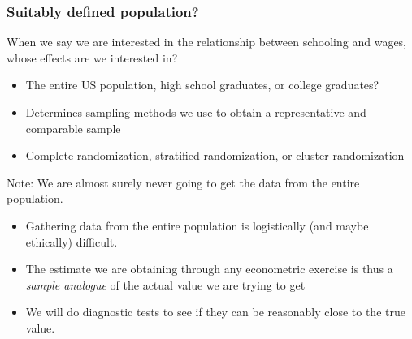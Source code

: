 \documentclass[aspectratio=169]{beamer}
\newenvironment{wideitemize}{\itemize\addtolength{\itemsep}{10pt}}{\enditemize}
\begin{document}
\begin{frame}
\frametitle{Suitably defined population?}
\begin{wideitemize}
\item When we say we are interested in the relationship between schooling and wages, whose effects are we interested in? 
\begin{itemize}
\item The entire US population, high school graduates, or college graduates?  
\item Determines sampling methods we use to obtain a representative and comparable sample
\item Complete randomization, stratified randomization, or cluster randomization
\end{itemize}
\item  Note: We are almost surely never going to get the data from the entire population. 
\begin{itemize}
\item Gathering data from the entire population is logistically (and maybe ethically) difficult. 
\item The estimate we are obtaining through any econometric exercise is thus a \textit{sample analogue} of the actual value we are trying to get
\item We will do diagnostic tests to see if they can be reasonably close to the true value. 
\end{itemize}
 \end{wideitemize}
\end{frame}
\end{document}
